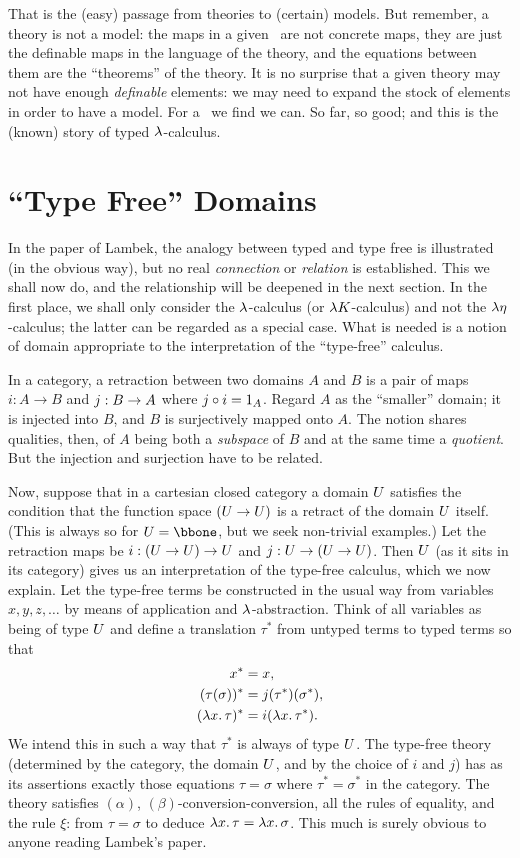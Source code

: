 That is the (easy) passage from theories to (certain) models. But remember, a theory is
not a model: the maps in a given \ccc\ are not concrete maps, they are just the definable
maps in the language of the theory, and the equations between them are the ``theorems'' of
the theory. It is no surprise that a given theory may not have enough {\it definable}
elements: we may need to expand the stock of elements in order to have a model. For a
\ccc\ we find we can. So far, so good; and this is the (known) story of typed
$\lambda$-calculus.

\section{``Type Free'' Domains}

In the paper of Lambek, the analogy between typed and type free is illustrated (in the
obvious way), but no real {\it connection} or {\it relation} is established. This we shall
now do, and the relationship will be deepened in the next section. In the first place, we
shall only consider the $\lambda$-calculus (or $\lambda K$-calculus) and not the $\lambda \eta$-calculus;
the latter can be regarded as a special case. What is needed is a notion of domain
appropriate to the interpretation of the ``type-free'' calculus.

In a category, a retraction between two domains $A$ and $B$ is a pair of maps $i: A\to B$
and $j : B \rightarrow A$ where $j \circ i = {\mathrm 1}_A$. Regard $A$ as the ``smaller'' domain; it is
injected into $B$, and $B$ is surjectively mapped onto $A$. The notion shares qualities,
then, of $A$ being both a {\it subspace} of $B$ and at the same time a {\it quotient}. But
the injection and surjection have to be related.

Now, suppose that in a cartesian closed category a domain $U$ satisfies the condition
that the function space $(U\rightarrow U)$ is a retract of the domain $U$ itself. (This is
always so for $\U = \bbone$, but we seek non-trivial examples.) Let the retraction maps be
$i: (U \rightarrow U) \rightarrow U$ and $j : U \rightarrow (U \rightarrow U)$. Then $U$ (as it sits in its
category) gives us an interpretation of the type-free calculus, which we now explain. Let
the type-free terms be constructed in the usual way from variables $x,y,z, \dots$ by means
of application and $\lambda$-abstraction. Think of all variables as being of type $U$ and
define a translation $\tau^*$ from untyped terms to typed terms so that
\begin{align*}
x^* &= x, \\
(\tau(\sigma))^* &= j(\tau^*)(\sigma^*),\\
(\lm{x}.\tau)^* &= i(\lm{x}.\tau^*).
\end{align*}
We intend this in such a way that $\tau^*$ is always of type $U$. The type-free theory
(determined by the category, the domain $U$, and by the choice of $i$ and $j$) has as its
assertions exactly those equations $\tau = \sigma$ where $\tau^* = \sigma^*$ in the
category. The theory satisfies $(\alpha)$, $(\beta)$-conversion-conversion, all the rules
of equality, and the rule $\xi$: from $\tau = \sigma$ to deduce $\lambda x .\, \tau = \lambda x .\,
\sigma$. This much is surely obvious to anyone reading Lambek's paper.

